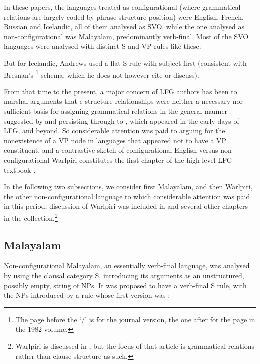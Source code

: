 \documentclass[output=paper,hidelinks]{langscibook}
\begin{document}
In these papers, the languages treated as configurational
(where grammatical relations are largely coded by phrase-structure position)
were English, French, Russian and Icelandic, all of them analysed as SVO, while
the one analysed as non-configurational was Malayalam, predominantly verb-final.
Most of the SVO languages were analysed with distinct S and VP rules like these:
\ea\label{vsorule}
\begin{xlist}
\item {}
\item {}
\end{xlist}
\z
But for Icelandic, Andrews used a flat S rule with subject first (consistent with
Bresnan's \citeyear[354/296]{bresnan1982control-complementation}\footnote{The page before the `/' is for the journal version, the one after for the
 page in the 1982 volume.}
schema, which he does not however cite or discuss).

From that time to the present, a major concern of LFG authors has been to marshal arguments that c-structure
relationships were neither a necessary nor sufficient basis for assigning grammatical
relations in the general manner suggested by
\citet{chomsky1965aspects} and persisting through to \citet{chomsky1981lectures}, which appeared in the early days of LFG, and beyond.
So considerable attention was paid to arguing for the nonexistence of a VP
node in languages that appeared not to have a VP constituent, and a contrastive sketch
of configurational English versus non-configurational Warlpiri constitutes the
first chapter of the high-level LFG textbook \citep{BresnanEtAl2016}.

In the following two subsections, we consider first Malayalam, and then Warlpiri,
the other non-configurational language to which considerable attention was paid
in this period; discussion of Warlpiri was included in \citet{bresnan1982control-complementation} and several
other chapters in the \citet{bresnan82} collection.\footnote
  {Warlpiri is discussed in \citet{SimpBres1983}, but the focus of that article
    is grammatical relations rather than clause structure as such.}

\subsection{Malayalam}
Non-configurational Malayalam, an essentially verb-final language, was analysed by
\citet{mohanan1982} using the clausal category S,
introducing its arguments as an unstructured, possibly empty, string of NPs.  It
was proposed to have a verb-final S rule, with
the NPs introduced by a rule whose first version was
\citep[507]{mohanan1982}:
\end{document}
